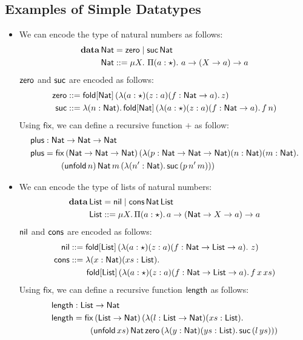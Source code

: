 \subsection{Examples of Simple Datatypes}

\begin{itemize}

\item We can encode the type of natural numbers as follows:
  \begin{align*}
    \data\,\Nat &= \zero \mid \suc\,\Nat \\
    \Nat &::= \mu X.\ \Pi(a : \star).\ a \rightarrow (X \rightarrow a) \rightarrow a    
  \end{align*}
  $\zero$ and $\suc$ are encoded as follows:
  \begin{align*}
    \zero &::= \fold{\Nat}{(\lambda (a : \star) (z : a) (f : \Nat \rightarrow a).\,z)}\\
    \suc &::= \lambda (n : \Nat).\,\fold{\Nat}{(\lambda (a : \star) (z : a) (f : \Nat \rightarrow a).\,f\,n)}
  \end{align*}
  Using $\mathsf{fix}$, we can define a recursive function $\plus$ as
  follow:
  \begin{align*}
    \plus &:\PlFunc\\
    \plus &=\mathsf{fix}\,(\PlFunc)\,(\lambda(p : \PlFunc)(n : \Nat)(m : \Nat).\\
          &\qquad (\unfold[\Nat]{n})\,\Nat\,m\,(\lambda (n^{\prime} : \Nat).\,\suc\,(p\,n^{\prime}\,m)))
  \end{align*}
\item We can encode the type of lists of natural numbers:
  \begin{align*}
    \data\,\List &= \nil \mid \cons\,\Nat\,\List \\
    \List &::= \mu X.\,\Pi(a : \star).\,a \rightarrow (\Nat \rightarrow X \rightarrow a) \rightarrow a    
  \end{align*}
  $\nil$ and $\cons$ are encoded as follows:
  \begin{align*}
    \nil &::= \fold{\List}{(\lambda (a : \star) (z : a) (f : \Nat \rightarrow \List \rightarrow a).\ z)}\\
    \cons &::= \lambda(x : \Nat)(xs : \List).\\
         &\qquad \fold{\List}{(\lambda(a : \star)(z : a)(f : \Nat\rightarrow \List \rightarrow a).\,f\,x\,xs)}
  \end{align*}
  Using $\mathsf{fix}$, we can define a recursive function $\length$
  as follows:
  \begin{align*}
    \length &: \List \rightarrow \Nat\\
    \length &= \mathsf{fix}\,(\List \rightarrow \Nat)\,(\lambda(l : \List
              \rightarrow \Nat)(xs : \List).\\
            &\qquad (\unfold[\List]{xs})\,\Nat\,\zero\,(\lambda(y : \Nat)(ys : \List).\,\suc\,(l\,ys)))
  \end{align*}
\end{itemize}

